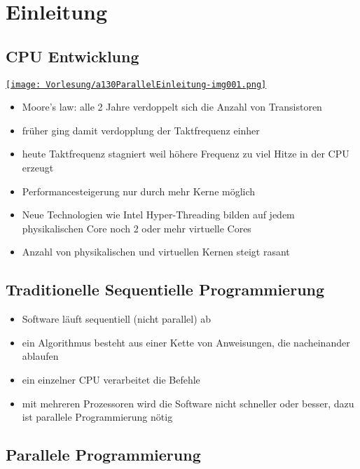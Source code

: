 \section{Einleitung}
\subsection{CPU Entwicklung}
\begin{center}
\href{https://www.karlrupp.net/2015/06/40-years-of-microprocessor-trend-data/}{ 
\texttt{[image: Vorlesung/a130ParallelEinleitung-img001.png]} }
\end{center}

\begin{itemize}
\item Moore's law: alle 2 Jahre verdoppelt sich die Anzahl von Transistoren
\item früher ging damit verdopplung der Taktfrequenz einher
\item heute Taktfrequenz stagniert weil höhere Frequenz zu viel Hitze in der CPU erzeugt
\item Performancesteigerung nur durch mehr Kerne möglich
\item Neue Technologien wie Intel Hyper-Threading bilden auf jedem physikalischen Core noch 2 oder mehr virtuelle Cores
\item Anzahl von physikalischen und virtuellen Kernen steigt rasant
\end{itemize}

\subsection{Traditionelle Sequentielle Programmierung}

\begin{itemize}
\item Software läuft sequentiell (nicht parallel) ab
\item ein Algorithmus besteht aus einer Kette von Anweisungen, die nacheinander ablaufen
\item ein einzelner CPU verarbeitet die Befehle
\item mit mehreren Prozessoren wird die Software nicht schneller oder besser, dazu ist parallele Programmierung nötig
\end{itemize}

\subsection{Parallele Programmierung}

